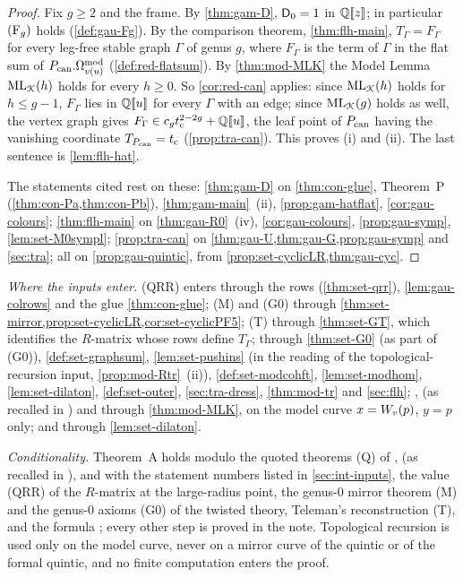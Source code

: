 \begin{proof}
Fix $g\geq2$ and the frame. By \cref{thm:gam-D}, $\mathsf{D}_0=1$ in $\mathbb{Q}[\![ z ]\!]$; in particular $(\mathrm{F}_{g})$ holds (\cref{def:gau-Fg}). By the comparison theorem, \cref{thm:flh-main}, $T_\Gamma=F_\Gamma$ for every leg-free stable graph $\Gamma$ of genus $g$, where $F_\Gamma$ is the term of $\Gamma$ in the flat sum of $P_{\mathrm{can}}.\Omega^{\mathrm{mod}}_{v(u)}$ (\cref{def:red-flatsum}). By \cref{thm:mod-MLK} the Model Lemma $\mathrm{ML}_{\mathcal{K}}(h)$ holds for every $h\geq0$. So \cref{cor:red-can} applies: since $\mathrm{ML}_{\mathcal{K}}(h)$ holds for $h\leq g-1$, $F_\Gamma$ lies in $\mathbb{Q}[\![ u ]\!]$ for every $\Gamma$ with an edge; since $\mathrm{ML}_{\mathcal{K}}(g)$ holds as well, the vertex graph gives $F_\Gamma\in c_gt_{\mathrm{c}}^{2-2g}+\mathbb{Q}[\![ u ]\!]$, the leaf point of $P_{\mathrm{can}}$ having the vanishing coordinate $T_{P_{\mathrm{can}}}=t_{\mathrm{c}}$ (\cref{prop:tra-can}). This proves (i) and (ii). The last sentence is \cref{lem:flh-hat}.

The statements cited rest on these: \cref{thm:gam-D} on \cref{thm:con-glue}, Theorem~P (\cref{thm:con-Pa,thm:con-Pb}), \cref{thm:gam-main}~(ii), \cref{prop:gam-hatflat}, \cref{cor:gau-colours}; \cref{thm:flh-main} on \cref{thm:gau-R0}~(iv), \cref{cor:gau-colours}, \cref{prop:gau-symp}, \cref{lem:set-M0sympl}; \cref{prop:tra-can} on \cref{thm:gau-U,thm:gau-G,prop:gau-symp} and \cref{sec:tra}; all on \cref{prop:gau-quintic}, from \cref{prop:set-cyclicLR,thm:gau-cyc}.
\end{proof}

\emph{Where the inputs enter.} (QRR) enters through the rows (\cref{thm:set-qrr}), \cref{lem:gau-colrows} and the glue \cref{thm:con-glue}; (M) and (G0) through \cref{thm:set-mirror,prop:set-cyclicLR,cor:set-cyclicPF5}; (T) through \cref{thm:set-GT}, which identifies the $R$-matrix whose rows define $T_\Gamma$; \cite{PPZ15} through \cref{thm:set-G0} (as part of (G0)), \cref{def:set-graphsum}, \cref{lem:set-pushins} (in the reading of the topological-recursion input, \cref{prop:mod-Rtr}~(ii)), \cref{def:set-modcohft}, \cref{lem:set-modhom}, \cref{lem:set-dilaton}, \cref{def:set-outer}, \cref{sec:tra-dress}, \cref{thm:mod-tr} and \cref{sec:flh}; \cite{Eynard:2007kz}, \cite{DuninBarkowski:2012bw} (as recalled in \cite{Dunin-Barkowski:2015caa}) and \cite{ABDKS25} through \cref{thm:mod-MLK}, on the model curve $x=W_{v}(p)$, $y=p$ only; and \cite[(1.7)]{AC96} through \cref{lem:set-dilaton}.

\emph{Conditionality.} Theorem~A holds modulo the quoted theorems (Q) of \cite{Eynard:2007kz}, \cite{DuninBarkowski:2012bw} (as recalled in \cite{Dunin-Barkowski:2015caa}), \cite{ABDKS25} and \cite{PPZ15} with the statement numbers listed in \cref{sec:int-inputs}, the value (QRR) of the $R$-matrix at the large-radius point, the genus-$0$ mirror theorem (M) and the genus-$0$ axioms (G0) of the twisted theory, Teleman's reconstruction (T), and the formula \cite[(1.7)]{AC96}; every other step is proved in the note. Topological recursion is used only on the model curve, never on a mirror curve of the quintic or of the formal quintic, and no finite computation enters the proof.

